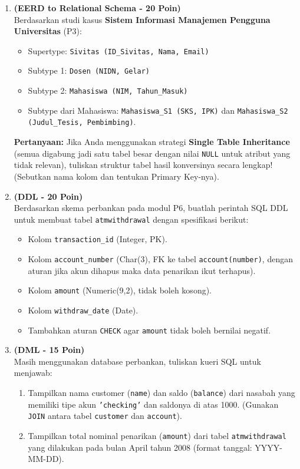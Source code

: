 \documentclass[11pt,a4paper]{article}
\begin{document}
\begin{enumerate}[start=7]
	\item \textbf{(EERD to Relational Schema - 20 Poin)}\\
	      Berdasarkan studi kasus \textbf{Sistem Informasi Manajemen Pengguna Universitas} (P3):
	      \begin{itemize}
		      \item Supertype: \texttt{Sivitas (ID\_Sivitas, Nama, Email)}
		      \item Subtype 1: \texttt{Dosen (NIDN, Gelar)}
		      \item Subtype 2: \texttt{Mahasiswa (NIM, Tahun\_Masuk)}
		      \item Subtype dari Mahasiswa: \texttt{Mahasiswa\_S1 (SKS, IPK)} dan \texttt{Mahasiswa\_S2 (Judul\_Tesis, Pembimbing)}.
	      \end{itemize}
	      \textbf{Pertanyaan:}
	      Jika Anda menggunakan strategi \textbf{Single Table Inheritance} (semua digabung jadi satu tabel besar dengan nilai \texttt{NULL} untuk atribut yang tidak relevan), tuliskan struktur tabel hasil konversinya secara lengkap! (Sebutkan nama kolom dan tentukan Primary Key-nya).

	\item \textbf{(DDL - 20 Poin)}\\
	      Berdasarkan skema perbankan pada modul P6, buatlah perintah SQL DDL untuk membuat tabel \texttt{atmwithdrawal} dengan spesifikasi berikut:
	      \begin{itemize}
		      \item Kolom \texttt{transaction\_id} (Integer, PK).
		      \item Kolom \texttt{account\_number} (Char(3), FK ke tabel \texttt{account(number)}, dengan aturan jika akun dihapus maka data penarikan ikut terhapus).
		      \item Kolom \texttt{amount} (Numeric(9,2), tidak boleh kosong).
		      \item Kolom \texttt{withdraw\_date} (Date).
		      \item Tambahkan aturan \texttt{CHECK} agar \texttt{amount} tidak boleh bernilai negatif.
	      \end{itemize}

	\item \textbf{(DML - 15 Poin)}\\
	      Masih menggunakan database perbankan, tuliskan kueri SQL untuk menjawab:
	      \begin{enumerate}[label=\alph*.]
		      \item Tampilkan nama customer (\texttt{name}) dan saldo (\texttt{balance}) dari nasabah yang memiliki tipe akun \texttt{'checking'} dan saldonya di atas 1000. (Gunakan \texttt{JOIN} antara tabel \texttt{customer} dan \texttt{account}).
		      \item Tampilkan total nominal penarikan (\texttt{amount}) dari tabel \texttt{atmwithdrawal} yang dilakukan pada bulan April tahun 2008 (format tanggal: YYYY-MM-DD).
	      \end{enumerate}


\end{enumerate}
\end{document}
